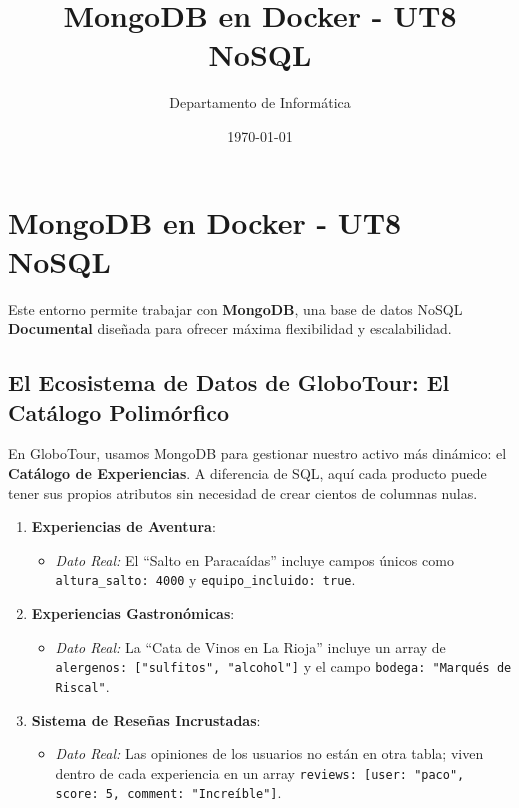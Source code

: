 \documentclass[12pt,a4paper]{article}
\title{\textbf{MongoDB en Docker - UT8 NoSQL}}
\author{Departamento de Informática}
\date{\today}
\begin{document}
\maketitle

\section{MongoDB en Docker - UT8 NoSQL}\label{mongodb-en-docker---ut8-nosql}

Este entorno permite trabajar con \textbf{MongoDB}, una base de datos NoSQL \textbf{Documental} diseñada para ofrecer máxima flexibilidad y escalabilidad.

\subsection{El Ecosistema de Datos de GloboTour: El Catálogo Polimórfico}\label{ecosistema}
En GloboTour, usamos MongoDB para gestionar nuestro activo más dinámico: el \textbf{Catálogo de Experiencias}. A diferencia de SQL, aquí cada producto puede tener sus propios atributos sin necesidad de crear cientos de columnas nulas.

\begin{enumerate}
    \item \textbf{Experiencias de Aventura}: 
    \begin{itemize}
        \item \textit{Dato Real:} El \enquote{Salto en Paracaídas} incluye campos únicos como \texttt{altura\_salto: 4000} y \texttt{equipo\_incluido: true}.
    \end{itemize}
    \item \textbf{Experiencias Gastronómicas}: 
    \begin{itemize}
        \item \textit{Dato Real:} La \enquote{Cata de Vinos en La Rioja} incluye un array de \texttt{alergenos: ["sulfitos", "alcohol"]} y el campo \texttt{bodega: "Marqués de Riscal"}.
    \end{itemize}
    \item \textbf{Sistema de Reseñas Incrustadas}:
    \begin{itemize}
        \item \textit{Dato Real:} Las opiniones de los usuarios no están en otra tabla; viven dentro de cada experiencia en un array \texttt{reviews: [{user: "paco", score: 5, comment: "Increíble"}]}.
    \end{itemize}
\end{enumerate}
\end{document}
